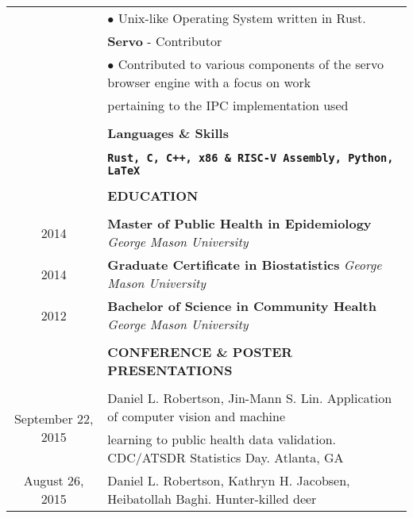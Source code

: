 \documentclass[10pt]{article}
\begin{document}
\begin{table}[ht]
\begin{tabular}{@{\hspace{0mm}}c@{\hspace{1mm}}c@{\hspace{3mm}}cl}
            & & & $\bullet$ Unix-like Operating System written in Rust.\\[2mm]
            & & & \textbf{Servo} - Contributor\\
            & & & $\bullet$ Contributed to various components of the servo browser engine with a focus on work\\
            & & & \hspace*{4mm}pertaining to the IPC implementation used\\[2mm]
            & & & \color{maroon}{\rule{14cm}{0.75pt}}\\
            & & & \large{\textbf{Languages \& Skills}}\\[-2mm]
            & & & \color{maroon}{\rule{14cm}{0.75pt}}\\
            \multicolumn{3}{c}{} & \textbf{\texttt{Rust, C, C++, x86 \& RISC-V Assembly, Python, \LaTeX}}\\[-1mm]
            & & & \color{maroon}{\rule{14cm}{0.75pt}}\\
            & & & \large{\textbf{EDUCATION}}\\[-2mm]
            & & & \color{maroon}{\rule{14cm}{0.75pt}}\\
            \multicolumn{3}{c}{2014} & \textbf{Master of Public Health in Epidemiology} \textit{George Mason University}\\[1mm]
            \multicolumn{3}{c}{2014} & \textbf{Graduate Certificate in Biostatistics} \textit{George Mason University}\\[1mm]
            \multicolumn{3}{c}{2012} & \textbf{Bachelor of Science in Community Health} \textit{George Mason University}\\[-1mm]
            & & & \color{maroon}{\rule{14cm}{0.75pt}}\\
            & & & \large{\textbf{CONFERENCE \& POSTER PRESENTATIONS}}\\[-2mm]
            & & & \color{maroon}{\rule{14cm}{0.75pt}}\\
            \multicolumn{3}{c}{\multirow{2}{*}{September 22, 2015}} & Daniel L. Robertson, Jin-Mann S. Lin. Application of computer vision and machine\\
            & & & learning to public health data validation. CDC/ATSDR Statistics Day. Atlanta, GA\\[2mm]
            \multicolumn{3}{c}{\multirow{4}{*}{August 26, 2015}} & Daniel L. Robertson, Kathryn H. Jacobsen, Heibatollah Baghi. Hunter-killed deer\\

\end{tabular}
\end{table}
\end{document}
